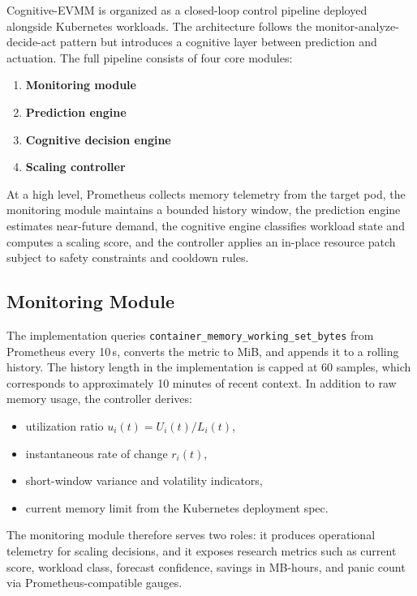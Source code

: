 \documentclass[12pt,a4paper]{article}
\newcommand{\keyword}[1]{\texttt{#1}}
\begin{document}
Cognitive-EVMM is organized as a closed-loop control pipeline deployed alongside Kubernetes workloads. The architecture follows the monitor-analyze-decide-act pattern but introduces a cognitive layer between prediction and actuation. The full pipeline consists of four core modules:
\begin{enumerate}[label=\arabic*)]
    \item \textbf{Monitoring module}
    \item \textbf{Prediction engine}
    \item \textbf{Cognitive decision engine}
    \item \textbf{Scaling controller}
\end{enumerate}

At a high level, Prometheus collects memory telemetry from the target pod, the monitoring module maintains a bounded history window, the prediction engine estimates near-future demand, the cognitive engine classifies workload state and computes a scaling score, and the controller applies an in-place resource patch subject to safety constraints and cooldown rules.

\subsection{Monitoring Module}

The implementation queries \keyword{container\_memory\_working\_set\_bytes} from Prometheus every 10\,s, converts the metric to MiB, and appends it to a rolling history. The history length in the implementation is capped at 60 samples, which corresponds to approximately 10 minutes of recent context. In addition to raw memory usage, the controller derives:
\begin{itemize}
    \item utilization ratio $u_i(t) = U_i(t)/L_i(t)$,
    \item instantaneous rate of change $r_i(t)$,
    \item short-window variance and volatility indicators,
    \item current memory limit from the Kubernetes deployment spec.
\end{itemize}

The monitoring module therefore serves two roles: it produces operational telemetry for scaling decisions, and it exposes research metrics such as current score, workload class, forecast confidence, savings in MB-hours, and panic count via Prometheus-compatible gauges.
\end{document}
